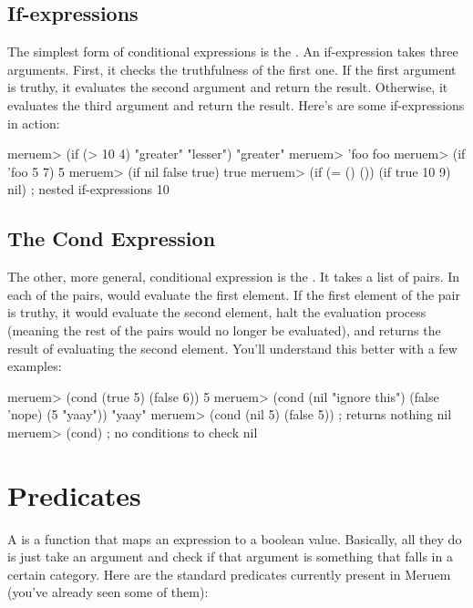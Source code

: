 \subsection{If-expressions}
The simplest form of conditional expressions is the . An if-expression takes three arguments. First, it checks the truthfulness of the first one. If the first argument is truthy, it evaluates the second argument and return the result. Otherwise, it evaluates the third argument and return the result. Here's are some if-expressions in action:

\begin{REPL}
meruem> (if (> 10 4) "greater" "lesser")
"greater"
meruem> 'foo                   
foo
meruem> (if 'foo 5 7)
5
meruem> (if nil false true)
true
meruem> (if (= () ()) (if true 10 9) nil)  ; nested if-expressions
10
\end{REPL}

\subsection{The Cond Expression}
The other, more general, conditional expression is the . It takes a list of pairs. In each of the pairs,  would evaluate the first element. If the first element of the pair is truthy, it would evaluate the second element, halt the evaluation process (meaning the rest of the pairs would no longer be evaluated), and returns the result of evaluating the second element. You'll understand this better with a few examples:

\begin{REPL}
meruem> (cond (true 5) (false 6))
5
meruem> (cond (nil "ignore this") (false 'nope) (5 "yaay"))
"yaay"
meruem> (cond (nil 5) (false 5))	; returns nothing
nil
meruem> (cond)  ; no conditions to check
nil
\end{REPL}

\section{Predicates}
A  is a function that maps an expression to a boolean value. Basically, all they do is just take an argument and check if that argument is something that falls in a certain category. Here are the standard predicates currently present in Meruem (you've already seen some of them):

